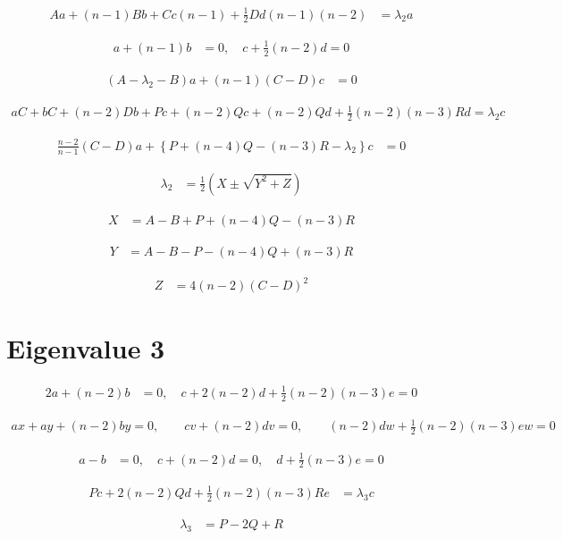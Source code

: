 \documentclass{article}
\begin{document}
\begin{align*}
A a + (n-1) B b + C c (n-1) + \frac{1}{2} D d (n-1)(n-2) &= \lambda_2 a 
\tag{A.10}
\end{align*}

\begin{align*}
a + (n-1) b &= 0, \quad c + \frac{1}{2}(n-2) d = 0 
\tag{A.11}
\end{align*}

\begin{align*}
\left(A - \lambda_2 - B\right) a + (n-1)(C-D) c &= 0 
\tag{A.12}
\end{align*}

\begin{align*}
a C+b C+(n-2) D b+P c+(n-2) Q c+(n-2) Q d+\frac{1}{2}(n-2)(n-3) R d=\lambda_{2} c
\tag{A.13}
\end{align*}

\begin{align*}
\frac{n-2}{n-1}(C-D) a + \left\{P + (n-4) Q - (n-3) R - \lambda_2\right\} c &= 0 
\tag{A.14}
\end{align*}

\begin{align*}
\lambda_2 &= \frac{1}{2}\left(X \pm \sqrt{Y^2 + Z}\right) 
\tag{A.15}
\end{align*}

\begin{align*}
X &= A - B + P + (n-4) Q - (n-3) R 
\tag{A.16}
\end{align*}

\begin{align*}
Y &= A - B - P - (n-4) Q + (n-3) R 
\tag{A.17}
\end{align*}

\begin{align*}
Z &= 4(n-2)(C-D)^2 
\tag{A.18}
\end{align*}

\section{Eigenvalue 3}

\begin{align*}
2 a + (n-2) b &= 0, \quad c + 2(n-2) d + \frac{1}{2}(n-2)(n-3) e = 0 
\tag{A.19}
\end{align*}

\begin{align*}
a x+a y+(n-2) b y=0, \qquad c v+(n-2) d v=0, \qquad (n-2) d w+\frac{1}{2}(n-2)(n-3) e w=0
\tag{A.20}
\end{align*}

\begin{align*}
a - b &= 0, \quad c + (n-2) d = 0, \quad d + \frac{1}{2}(n-3) e = 0 
\tag{A.21}
\end{align*}

\begin{align*}
P c + 2(n-2) Q d + \frac{1}{2}(n-2)(n-3) R e &= \lambda_3 c 
\tag{A.22}
\end{align*}

\begin{align*}
\lambda_3 &= P - 2 Q + R 
\tag{A.23}
\end{align*}
\end{document}
